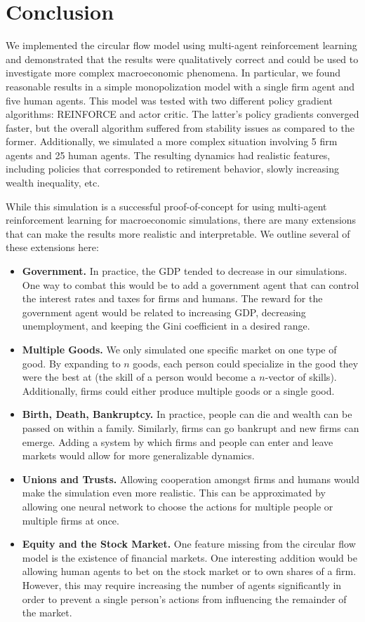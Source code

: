 \documentclass[twoside,twocolumn]{article}
\begin{document}
\section{Conclusion}

We implemented the circular flow model using multi-agent reinforcement learning and demonstrated that the results were qualitatively correct and could be used to investigate more complex macroeconomic phenomena. In particular, we found reasonable results in a simple monopolization model with a single firm agent and five human agents. This model was tested with two different policy gradient algorithms: REINFORCE and actor critic. The latter's policy gradients converged faster, but the overall algorithm suffered from stability issues as compared to the former. Additionally, we simulated a more complex situation involving 5 firm agents and 25 human agents. The resulting dynamics had realistic features, including policies that corresponded to retirement behavior, slowly increasing wealth inequality, etc.

\medskip 

While this simulation is a successful proof-of-concept for using multi-agent reinforcement learning for  macroeconomic simulations, there are many extensions that can make the results more realistic and interpretable. We outline several of these extensions here:
\begin{itemize}
  \item \textbf{Government.} In practice, the GDP tended to decrease in our simulations. One way to combat this would be to add a government agent that can control the interest rates and taxes for firms and humans. The reward for the government agent would be related to increasing GDP, decreasing unemployment, and keeping the Gini coefficient in a desired range.
  \item \textbf{Multiple Goods.} We only simulated one specific market on one type of good. By expanding to $n$ goods, each person could specialize in the good they were the best at (the skill of a person would become a $n$-vector of skills). Additionally, firms could either produce multiple goods or a single good. 
  \item \textbf{Birth, Death, Bankruptcy.} In practice, people can die and wealth can be passed on within a family. Similarly, firms can go bankrupt and new firms can emerge. Adding a system by which firms and people can enter and leave markets would allow for more generalizable dynamics.
  \item \textbf{Unions and Trusts.} Allowing cooperation amongst firms and humans would make the simulation even more realistic. This can be approximated by allowing one neural network to choose the actions for multiple people or multiple firms at once.
  \item \textbf{Equity and the Stock Market.} One feature missing from the circular flow model is the existence of financial markets. One interesting addition would be allowing human agents to bet on the stock market or to own shares of a firm. However, this may require increasing the number of agents significantly in order to prevent a single person's actions from influencing the remainder of the market.
\end{itemize}
\end{document}

